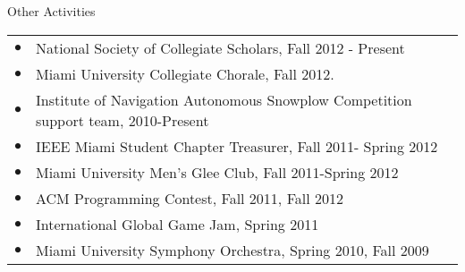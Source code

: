 \documentclass{resume} %
\begin{document}
\begin{rSection}{Other Activities}
  \begin{tabular}{ll}
    $\bullet$ & National Society of Collegiate Scholars, Fall 2012 - Present\\
    $\bullet$ & Miami University Collegiate Chorale, Fall 2012.\\
    $\bullet$ & Institute of Navigation Autonomous Snowplow Competition support team, 2010-Present\\
    $\bullet$ & IEEE Miami Student Chapter Treasurer, Fall 2011- Spring 2012\\
    $\bullet$ & Miami University Men’s Glee Club, Fall 2011-Spring 2012\\
    $\bullet$ & ACM Programming Contest, Fall 2011, Fall 2012\\
    $\bullet$ & International Global Game Jam, Spring 2011\\
    $\bullet$ & Miami University Symphony Orchestra, Spring 2010, Fall 2009\\
  \end{tabular}
\end{rSection}
\end{document}
